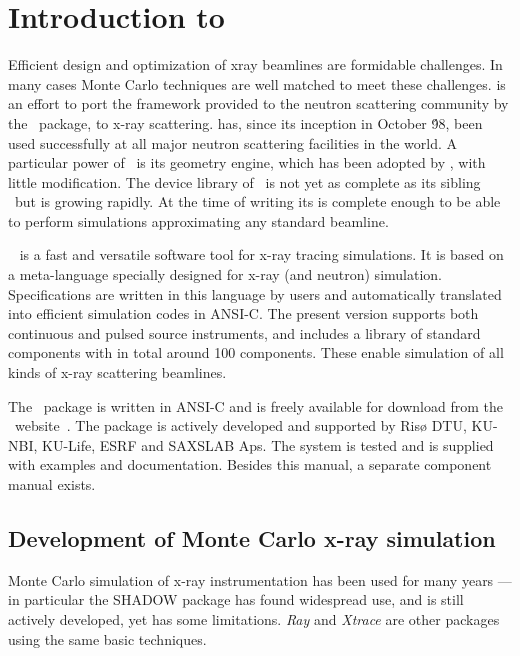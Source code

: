 
\chapter{Introduction to \MCX}

Efficient design and optimization of xray beamlines are
formidable challenges. In many cases Monte Carlo techniques are well matched to meet
these challenges. 
\MCX is an effort to port the framework provided to the neutron scattering community by the \MCS\ package, to x-ray scattering. \MCS has, since its inception in October \'98, been used successfully at all major neutron scattering facilities in the world. A particular power of \MCS\ is its geometry engine, which has been adopted by \MCX, with little modification. The device library of \MCX\ is not yet as complete as its sibling \MCS\ but is growing rapidly.
At the time of writing its is complete enough to be able to perform simulations approximating any standard beamline.

\MCX\ %
is a fast and versatile software tool for x-ray tracing simulations.
It is based on a meta-language specially designed for x-ray (and neutron)
simulation. Specifications are written in this language by users and
automatically translated into efficient simulation codes in ANSI-C.
The present version supports both continuous and pulsed source instruments, and includes a library of standard
components with in total around 100 components. These enable simulation of all kinds of x-ray scattering beamlines.

The \MCX\ package is written in ANSI-C and is freely available for download
from the \MCX\ website~\cite{mcxtrace_webpage}. The package is actively
developed and supported by  Risø DTU, KU-NBI, KU-Life, ESRF and SAXSLAB Aps.
The system is tested and is supplied with examples and documentation.
Besides this manual, a separate component manual exists.


\section{Development of Monte Carlo x-ray simulation}
Monte Carlo simulation of x-ray instrumentation has been used for many years --- in particular the SHADOW package 
\cite{welnak1994shadow,sanchez2011shadow3}
has found widespread use, and is still actively developed, yet has some
limitations. \emph{Ray}\cite{schaefers2008bessy} and \emph{Xtrace}\cite{bauer2007simulation} are other packages using the same
basic techniques. 


